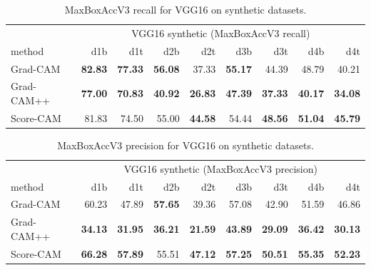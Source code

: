 \begin{table}[ht]
\centering
\begin{tabular}{lrrrrrrrr}
\toprule
 & \multicolumn{8}{c}{VGG16 synthetic (MaxBoxAccV3 recall)} \\
method & d1b & d1t & d2b & d2t & d3b & d3t & d4b & d4t \\
\cmidrule(lr){1-1} \cmidrule(lr){2-9} 
Grad-CAM & \color{teal} \bfseries 82.83 & \color{teal} \bfseries 77.33 & \color{teal} \bfseries 56.08 & 37.33 & \color{teal} \bfseries 55.17 & 44.39 & 48.79 & 40.21 \\
Grad-CAM++ & \color{purple} \bfseries 77.00 & \color{purple} \bfseries 70.83 & \color{purple} \bfseries 40.92 & \color{purple} \bfseries 26.83 & \color{purple} \bfseries 47.39 & \color{purple} \bfseries 37.33 & \color{purple} \bfseries 40.17 & \color{purple} \bfseries 34.08 \\
Score-CAM & 81.83 & 74.50 & 55.00 & \color{teal} \bfseries 44.58 & 54.44 & \color{teal} \bfseries 48.56 & \color{teal} \bfseries 51.04 & \color{teal} \bfseries 45.79 \\
\bottomrule
\end{tabular}
\caption[MaxBoxAccV3 recall for VGG16 on synthetic datasets]{MaxBoxAccV3 recall for VGG16 on synthetic datasets.}
\label{tab:maxboxaccv3_recall_vgg16_base_synthetic}
\end{table}

\begin{table}[ht]
\centering
\begin{tabular}{lrrrrrrrr}
\toprule
 & \multicolumn{8}{c}{VGG16 synthetic (MaxBoxAccV3 precision)} \\
method & d1b & d1t & d2b & d2t & d3b & d3t & d4b & d4t \\
\cmidrule(lr){1-1} \cmidrule(lr){2-9}
Grad-CAM & 60.23 & 47.89 & \color{teal} \bfseries 57.65 & 39.36 & 57.08 & 42.90 & 51.59 & 46.86 \\
Grad-CAM++ & \color{purple} \bfseries 34.13 & \color{purple} \bfseries 31.95 & \color{purple} \bfseries 36.21 & \color{purple} \bfseries 21.59 & \color{purple} \bfseries 43.89 & \color{purple} \bfseries 29.09 & \color{purple} \bfseries 36.42 & \color{purple} \bfseries 30.13 \\
Score-CAM & \color{teal} \bfseries 66.28 & \color{teal} \bfseries 57.89 & 55.51 & \color{teal} \bfseries 47.12 & \color{teal} \bfseries 57.25 & \color{teal} \bfseries 50.51 & \color{teal} \bfseries 55.35 & \color{teal} \bfseries 52.23 \\
\bottomrule
\end{tabular}
\caption[MaxBoxAccV3 precision for VGG16 on synthetic datasets]{MaxBoxAccV3 precision for VGG16 on synthetic datasets.}
\label{tab:maxboxaccv3_precision_vgg16_base_synthetic}
\end{table}

